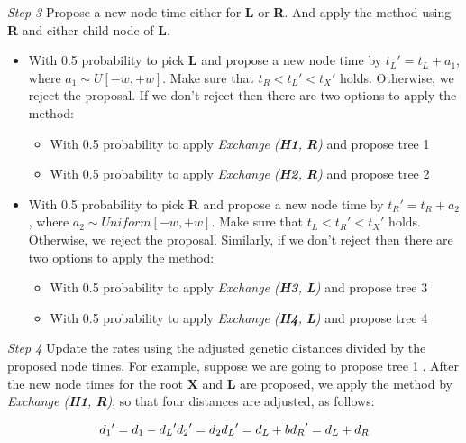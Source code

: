 \documentclass{bmcart}
\begin{document}
\emph{Step 3} Propose a new node time either for \textbf{L} or \textbf{R}. And apply the method using \textbf{R} and either child node of \textbf{L}.
\begin{itemize}
\item With 0.5 probability to pick \textbf{L} and propose a new node time by ${t_L}' = {t_L} + {a_1}$, where ${a_1} \sim U[ - w, + w]$. Make sure that ${t_R} < {t_L}' < {t_X}'$ holds. Otherwise, we reject the proposal. If we don't reject then there are two options to apply the method:
\begin{itemize}
\item With 0.5 probability to apply \textit{Exchange (\textbf{H1}, \textbf{R})} and propose tree \textcircled1

\item With 0.5 probability to apply \textit{Exchange (\textbf{H2}, \textbf{R})} and propose tree \textcircled2
\end{itemize}

\item With 0.5 probability to pick \textbf{R} and propose a new node time by ${t_R}' = {t_R} + {a_2}$, where ${a_2} \sim Uniform[ - w, + w]$. Make sure that ${t_L} < {t_R}' < {t_X}'$ holds. Otherwise, we reject the proposal. Similarly, if we don't reject then there are two options to apply the method:
  \begin{itemize}
  \item With 0.5 probability to apply \textit{Exchange (\textbf{H3}, \textbf{L})} and propose tree \textcircled3
  \item With 0.5 probability to apply \textit{Exchange (\textbf{H4}, \textbf{L})} and propose tree \textcircled4 
  \end{itemize}
\end{itemize}

\emph{Step 4}  Update the rates using the adjusted genetic distances divided by the proposed node times. For example, suppose we are going to propose tree \textcircled1. After the new node times for the root \textbf{X} and \textbf{L} are proposed, we apply the method by \textit{Exchange (\textbf{H1}, \textbf{R})}, so that four distances are adjusted, as follows:

\begin{equation}\label{example1.1}
{d_1}' = {d_1} - {d_L}'  \\
{d_2}' = {d_2} \\
{d_L}' = {d_L} + b \\
{d_R}' = {d_L} + {d_R}
\end{equation}
\end{document}
